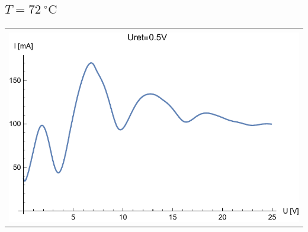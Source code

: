 \documentclass[paper=a4, fontsize=12pt]{scrartcl}
\begin{document}
\subsection{$T=72\:^\circ\mathrm{C}$}{
\begin{tabular}{|c|}
	\hline\\
	\includegraphics[width=0.6\linewidth]{wyk8}
	\label{fig:wyk8}\\
	\hline
\end{tabular}

}
\end{document}
